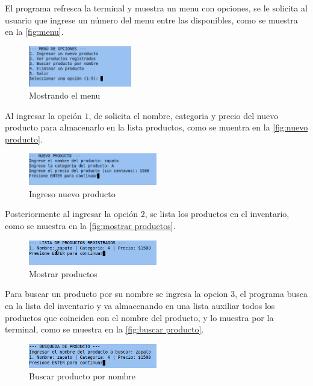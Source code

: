\documentclass[12pt]{article}
\begin{document}
El programa refresca la terminal y muestra un menu con opciones, se le solicita al usuario que ingrese un número del menu entre las disponibles, como se muestra en la \autoref{fig:menu}.

\begin{figure}[H]
	\centering
	\setlength{\fboxrule}{0pt}
	\includegraphics[width=0.4\textwidth]{img1.png}
	\caption{Mostrando el menu}
	\label{fig:menu}
\end{figure} 

Al ingresar la opción $1$, de solicita el nombre, categoria y precio del nuevo producto para almacenarlo en la lista productos, como se muentra en la \autoref{fig:nuevo producto}.

\begin{figure}[H]
	\centering
	\setlength{\fboxrule}{0pt}
	\includegraphics[width=0.5\textwidth]{img2.png}
	\caption{Ingreso nuevo producto}
	\label{fig:nuevo producto}
\end{figure} 

Posteriormente al ingresar la opción $2$, se lista los productos en el inventario, como se muestra en la \autoref{fig:mostrar productos}.

\begin{figure}[H]
	\centering
	\setlength{\fboxrule}{0pt}
	\includegraphics[width=0.5\textwidth]{img3.png}
	\caption{Mostrar productos}
	\label{fig:mostrar productos}
\end{figure} 

Para buscar un producto por su nombre se ingresa la opcion $3$, el programa busca en la lista del inventario y va almacenando en una lista auxiliar todos los productos que coinciden con el nombre del producto, y lo muestra por la terminal, como se muestra en la \autoref{fig:buscar producto}.

\begin{figure}[H]
	\centering
	\setlength{\fboxrule}{0pt}
	\includegraphics[width=0.5\textwidth]{img4.png}
	\caption{Buscar producto por nombre}
	\label{fig:buscar producto}
\end{figure} 
\end{document}

